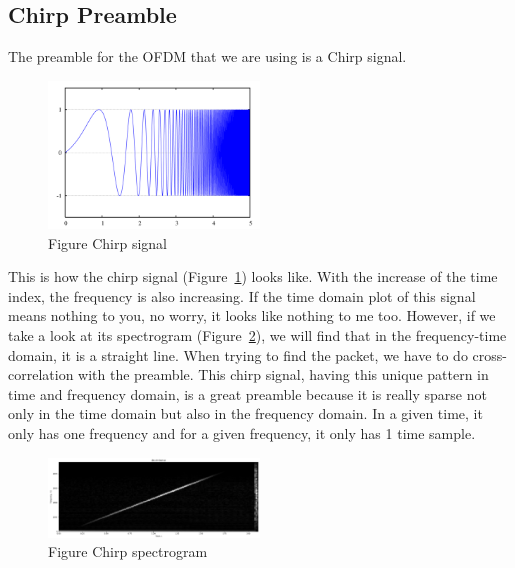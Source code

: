 \documentclass[twocolumn,conference]{IEEEtran}
\begin{document}
\subsection{Chirp Preamble}
The preamble for the OFDM that we are using is a Chirp signal.
\begin{figure}[h]
    \centering
    \includegraphics[width=0.5\textwidth]{./asset/chirp.png}
    \caption{Figure Chirp signal}
    \label{fig:Chirp_signal}
\end{figure}
This is how the chirp signal (Figure~\ref{fig:Chirp_signal}) looks like. With the increase of the time index, the frequency is also increasing. If the time domain plot of this signal means nothing to you, no worry, it looks like nothing to me too. However, if we take a look at its spectrogram (Figure~\ref{fig:Chirp_spectrogram}), we will find that in the frequency-time domain, it is a straight line. When trying to find the packet, we have to do cross-correlation with the preamble. This chirp signal, having this unique pattern in time and frequency domain, is a great preamble because it is really sparse not only in the time domain but also in the frequency domain. In a given time, it only has one frequency and for a given frequency, it only has 1 time sample.
\begin{figure}[h]
    \centering
    \includegraphics[width=0.5\textwidth]{./asset/chirp_spect.png}
    \caption{Figure Chirp spectrogram}
    \label{fig:Chirp_spectrogram}
\end{figure}
\end{document}
